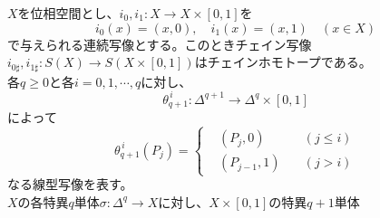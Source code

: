\documentclass[dvipdfmx,a4paper,11pt]{jsarticle}
\begin{document}
\begin{tcolorbox}[title = 補題1,upperbox = visible]
  $X$を位相空間とし、$i_{0},i_{1}:X\to X\times [0,1]$を
  \begin{equation*}
    i_{0}(x)=(x,0),\quad i_{1}(x)=(x,1)\quad (x\in X)
  \end{equation*}
  で与えられる連続写像とする。このときチェイン写像$i_{0\sharp},i_{1\sharp}:S(X)\to S(X\times [0,1])$はチェインホモトープである。
  \tcblower
  \\
  各$q\geq 0$と各$i=0,1,\cdots,q$に対し、
  \begin{equation*}
    \theta_{q+1}^{\, i}:\Delta^{q+1}\to \Delta^{q}\times [0,1]
  \end{equation*}
  によって
  \begin{equation*}
    \theta_{q+1}^{\, i}(P_{j})=\left\{
      \begin{alignedat}{2}
        &(P_{j},0)\quad &(j\leq i)\\
        &(P_{j-1},1)\quad &(j>i)
      \end{alignedat}
    \right.
  \end{equation*}
  なる線型写像を表す。\\
  $X$の各特異$q$単体$\sigma : \Delta^{q}\to X$に対し、$X\times [0,1]$の特異$q+1$単体
  \begin{center}
\end{center}
\end{tcolorbox}
\end{document}
